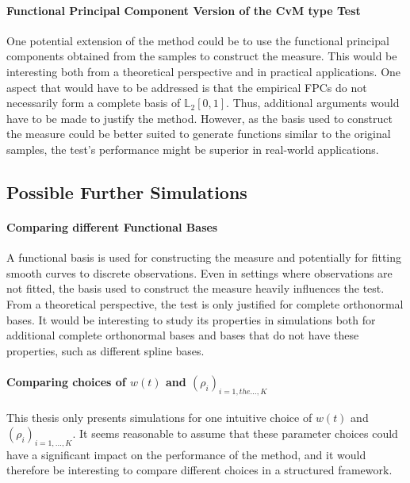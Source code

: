 \documentclass[12pt, a4paper]{article}
\theoremstyle{MAstyle} \newtheorem{assumption}{Assumption}[section]
\theoremstyle{MAstyle} \newtheorem{definition}{Definition}[section]
\theoremstyle{MAstyle} \newtheorem{theorem}{Theorem}[section]
\begin{document}
			\paragraph{Functional Principal Component Version of the CvM type Test\\}
			One potential extension of the method could be to use the functional principal components obtained from the samples to construct the measure. This would be interesting both from a theoretical perspective and in practical applications. 
			One aspect that would have to be addressed is that the empirical FPCs do not necessarily form a complete basis of $\mathbb{L}_2[0,1]$. Thus, additional arguments would have to be made to justify the method. However, as the basis used to construct the measure could be better suited to generate functions similar to the original samples, the test's performance might be superior in real-world applications.
		
		\subsection{Possible Further Simulations}
			
			\paragraph{Comparing different Functional Bases\\} 
			A functional basis is used for constructing the measure and potentially for fitting smooth curves to discrete observations. Even in settings where observations are not fitted, the basis used to construct the measure heavily influences the test. From a theoretical perspective, the test is only justified for complete orthonormal bases. It would be interesting to study its properties in simulations both for additional complete orthonormal bases and bases that do not have these properties, such as different spline bases.
		
			\paragraph{Comparing choices of $w(t)$ and  $\left(\rho_i\right)_{i = 1, the \dots, K}$\\}
			This thesis only presents simulations for one intuitive choice of $w(t)$ and $\left(\rho_i\right)_{i = 1, \dots, K}$. It seems reasonable to assume that these parameter choices could have a significant impact on the performance of the method, and it would therefore be interesting to compare different choices in a structured framework.
			
\end{document}
